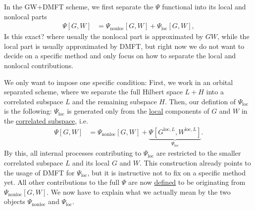 \documentclass[12pt,a4paper]{scrartcl}
\numberwithin{equation}{section}
\newcommand{\cng}[1]{{\color{red}#1}}
\begin{document}
\bigskip

In the GW+DMFT scheme, we first separate the $\Psi$ functional into
its local and nonlocal parts
\begin{align}
\Psi[G,W] &= \Psi_{\mathrm{nonloc}}[G,W] + \Psi_{\mathrm{loc}}[G,W],
\end{align}
\cng{Is this exact?}
where usually the nonlocal part is approximated by $GW$, while the local part is usually approximated by DMFT,
but right now we do not want to decide on a specific method and only focus
on how to separate the local and nonlocal contributions.

We only want to impose one specific condition: First, we work in an orbital separated scheme,
where we separate the full Hilbert space $L+H$ into a correlated subspace $L$ and the remaining subspace $H$.
Then, our defintion of $\Psi_{\mathrm{loc}}$ is the following: $\Psi_{\mathrm{loc}}$ is generated only from the \underline{local}
components of $G$ and $W$ in the \underline{correlated subspace}, i.e.
\begin{align}
\Psi[G,W] &= \Psi_{\mathrm{nonloc}}[G,W] + \underbrace{\Psi_{}[G^{\mathrm{loc},L},W^{\mathrm{loc},L}]}_{\Psi_{\mathrm{loc}}}.
\label{eq:psi_separation_nonloc_loc}
\end{align}
By this, all internal processes contributing to $\Psi_{\mathrm{loc}}$ 
are restricted to the smaller correlated subspace $L$ and its local $G$ and $W$.
This construction already points to the usage of DMFT for $\Psi_{\mathrm{loc}}$, but it is instructive
not to fix on a specific method yet.
% 
% 
% 
% 
% 
% 
All other contributions to the full $\Psi$ are now \underline{defined} to be originating from $\Psi_{\mathrm{nonloc}}[G,W]$.
We now have to explain what we actually mean by the two objects 
$\Psi_{\mathrm{nonloc}}$ and $\Psi_{\mathrm{loc}}$.

% 
\end{document}
